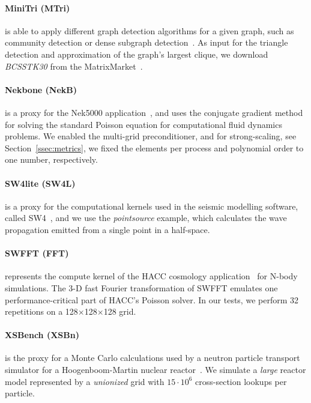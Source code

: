 \paragraph{MiniTri (MTri)} is able to apply different graph detection algorithms for a given graph,
such as community detection or dense subgraph detection~\cite{wolf_task-based_2015}.
As input for the triangle detection and approximation of the graph's largest clique, we download
\textit{BCSSTK30} from the MatrixMarket~\cite{boisvert_matrix_1997}.

\paragraph{Nekbone (NekB)} is a proxy for the Nek5000 application~\cite{argonne_national_laboratory_nek5000_nodate}, and uses the conjugate
gradient method for solving the standard Poisson equation for computational fluid dynamics problems.
We enabled the multi-grid preconditioner, and for strong-scaling, see Section~\ref{ssec:metrics},
we fixed the elements per process and polynomial order to one number, respectively.

\paragraph{SW4lite (SW4L)} is a proxy for the computational kernels used in the seismic modelling
software, called SW4~\cite{petersson_users_2017}, and we use the \textit{pointsource} example, which calculates the wave
propagation emitted from a single point in a half-space.

\paragraph{SWFFT (FFT)} represents the compute kernel of the HACC cosmology application~\cite{habib_hacc:_2016}
for N-body simulations. The 3-D fast Fourier transformation of SWFFT emulates
one performance-critical part of HACC's Poisson solver. In our tests, we perform 32 repetitions on a
128$\times$128$\times$128 grid.

\paragraph{XSBench (XSBn)} is the proxy for a Monte Carlo calculations used by a neutron particle transport
simulator for a Hoogenboom-Martin nuclear reactor~\cite{tramm_xsbench_2014}. We simulate a \textit{large} reactor model
represented by a \textit{unionized} grid with $15\cdot10^6$ cross-section lookups per particle.



